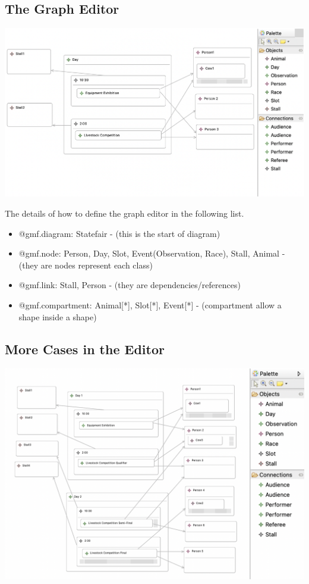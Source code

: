 \documentclass[12pt]{article}
\begin{document}
\subsection{The Graph Editor}
\includegraphics[scale = 0.6]{img/eugenia-editor}

The details of how to define the graph editor in the following list.

\begin{itemize}
    \item @gmf.diagram: Statefair - (this is the start of diagram)
    \item @gmf.node: Person, Day, Slot, Event(Observation, Race), Stall, Animal - (they are nodes represent each class)
    \item @gmf.link: Stall, Person - (they are dependencies/references)
    \item @gmf.compartment: Animal[*], Slot[*], Event[*] - (compartment allow a shape inside a shape)
\end{itemize}

\subsection{More Cases in the Editor}
\includegraphics[scale = 0.6]{img/eugenia-editor-more}
\end{document}

